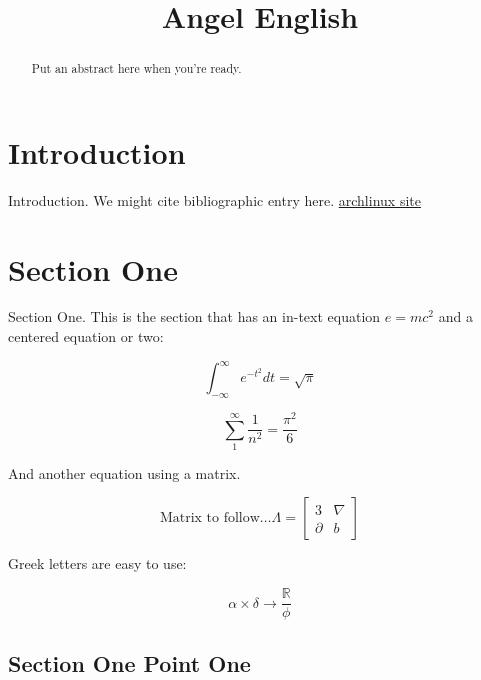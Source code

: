 \documentclass{amsart}
\title{Angel English}
\theoremstyle{definition} %
\begin{document}
\begin{abstract}
 Put an abstract here when you're ready.
\end{abstract}

\maketitle

\tableofcontents

\section{Introduction}

Introduction.  We might cite bibliographic entry \cite{SJE} here.
\href{https://www.archlinux.org}{archlinux site}

\section{Section One}

Section One.  This is the section that has an in-text equation
\(e=mc^2\) and a centered equation or two:

\begin{equation}
 \int_{-\infty}^\infty e^{-t^2}dt = \sqrt{\pi}
\end{equation}

\begin{equation*} %
 \sum_1^\infty \frac{1}{n^2} = \frac{\pi^2}{6}
\end{equation*}

And another equation using a matrix.

\begin{equation}
 \textrm{Matrix to follow\ldots }
 \Lambda =
 \begin{bmatrix}
   3        &  \nabla \\
   \partial &  b
 \end{bmatrix}
\end{equation}

Greek letters are easy to use:

\begin{equation}
 \alpha \times \delta \rightarrow \frac{\mathbb R}{\phi}
\end{equation}

\subsection{Section One Point One}
\end{document}
